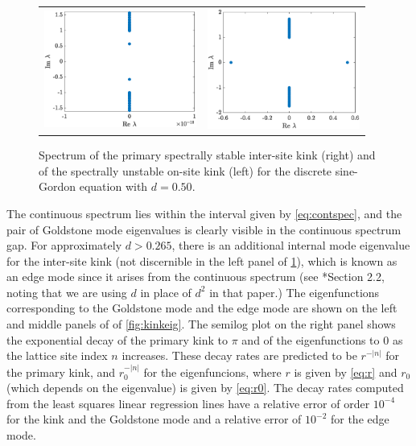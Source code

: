 \documentclass[12pt,reqno]{amsart}
\begin{document}
\begin{figure}[H]
\begin{center}
\begin{tabular}{cc}
\includegraphics[width=5cm]{1kinkspectrum.eps}	&
\includegraphics[width=5cm]{1kinkonsitespectrum.eps}
\end{tabular}
\end{center}
\caption{Spectrum of the primary spectrally stable 
inter-site kink (right) and of the spectrally unstable 
on-site kink (left) for the discrete sine-Gordon equation with $d = 0.50$.}
\label{fig:kinkspec}
\end{figure}

The continuous spectrum lies within the interval given by \cref{eq:contspec}, and the pair of Goldstone mode eigenvalues is clearly visible in the continuous spectrum gap. For approximately $d > 0.265$, there is an additional internal mode eigenvalue for the inter-site kink (not discernible in the left panel of \cref{fig:kinkspec}), which is known as an edge mode since it arises from the continuous spectrum (see \cite{KevrekidisWeinstein2000}*{Section 2.2}, noting that we are using $d$ in place of $d^2$ in that paper.) The eigenfunctions corresponding to the Goldstone mode and the edge mode are shown on the left and middle panels of of \cref{fig:kinkeig}. The semilog plot on the right panel shows the exponential decay of the primary kink to $\pi$ and of the eigenfunctions to 0 as the lattice site index $n$ increases. These decay rates are predicted to be $r^{-|n|}$ for the primary kink, and $r_0^{-|n|}$ for the eigenfuncions, where $r$ is given by \cref{eq:r} and $r_0$ (which depends on the eigenvalue) is given by \cref{eq:r0}. The decay rates computed from the least squares linear regression lines have a relative error of order $10^{-4}$ for the kink and the Goldstone mode and a relative error of $10^{-2}$ for the edge mode.
\end{document}
